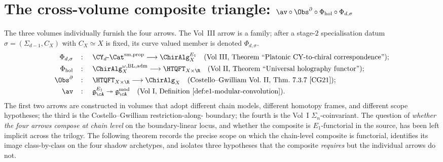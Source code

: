 \section{The cross-volume composite triangle:
$\av \circ \Obs^\partial \circ \Phi_{\mathrm{hol}} \circ \Phi_{d,\sigma}$}
\label{sec:hdm-cross-volume-triangle}

The three volumes individually furnish the four arrows. The Vol~III
arrow is a family; after a stage-$2$ specialisation datum
$\sigma=(\Sigma_{d-1},C_X)$ with $C_X\simeq X$ is fixed, its curve
valued member is denoted $\Phi_{d,\sigma}$.
\[
 \begin{array}{rcl}
 \Phi_{d,\sigma} & \colon &
 \CY_d\text{-}\Cat^{\mathrm{sm,prop}}
 \longrightarrow \ChirAlg_X^{E_1}
 \quad
 \text{\textup{(}Vol~III, Theorem ``Platonic CY-to-chiral correspondence''\textup{);}}
 \\[3pt]
 \Phi_{\mathrm{hol}} & \colon &
 \ChirAlg^{\omega,\mathrm{BL,adm}}_X
 \longrightarrow \HTQFT_{X \times \R}
 \quad
 \text{\textup{(}Vol~II,
 Theorem ``Universal holography functor''\textup{);}}
 \\[3pt]
 \Obs^\partial & \colon &
 \HTQFT_{X \times \R}
 \longrightarrow \ChirAlg_X
 \quad
 \text{\textup{(}Costello--Gwilliam Vol.~II,
 Thm.~7.3.7~\cite{CG21}\textup{);}}
 \\[3pt]
 \av & \colon &
 \mathfrak{g}^{E_1}_\cA
 \twoheadrightarrow \mathfrak{g}^{\mathrm{mod}}_\cA
 \quad
 \text{\textup{(}Vol~I,
 Definition~\textup{\ref{def:e1-modular-convolution}}\textup{).}}
 \end{array}
\]
The first two arrows are constructed in volumes that adopt different
chain models, different homotopy frames, and different scope
hypotheses; the third is the Costello--Gwilliam restriction-along-
boundary; the fourth is the Vol~I $\Sigma_n$-coinvariant. The
question of \emph{whether the four arrows compose at chain level}
on the boundary-linear locus, and whether the composite is
$E_1$-functorial in the source, has been left implicit across the
trilogy. The following theorem records the precise scope on which
the chain-level composite is functorial, identifies its image
class-by-class on the four shadow archetypes, and isolates three
hypotheses that the composite \emph{requires} but the individual
arrows do not.

